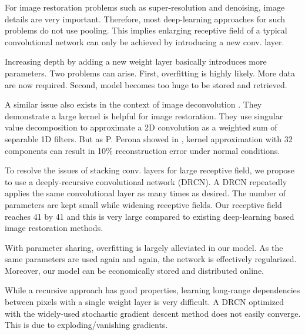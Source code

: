 \documentclass[10pt,twocolumn,letterpaper]{article}
\begin{document}
For image restoration problems such as super-resolution and denoising, image details are very important. Therefore, most deep-learning approaches for such problems do not use pooling. This implies enlarging receptive field of a typical convolutional network can only be achieved by introducing a new conv. layer.

Increasing depth by adding a new weight layer basically introduces more parameters. Two problems can arise. First, overfitting is highly likely. More data are now required. Second, model becomes too huge to be stored and retrieved.

A similar issue also exists in the context of image deconvolution \cite{xu2014deep}. They demonstrate a large kernel is helpful for image restoration. They use singular value decomposition to approximate a 2D convolution as a weighted sum of separable 1D filters. But as P. Perona showed in \cite{perona1995deformable},  kernel approximation with 32 components can result in 10\% reconstruction error under normal conditions. 



To resolve the issues of stacking conv. layers for large receptive field, we propose to use a deeply-recursive convolutional network (DRCN). A DRCN repeatedly applies the same convolutional layer as many times as desired. The number of parameters are kept small while widening receptive fields. Our receptive field reaches 41 by 41 and this is very large compared to existing deep-learning based image restoration methods. 

With parameter sharing, overfitting is largely alleviated in our model. As the same parameters are used again and again, the network is effectively regularized. Moreover, our model can be economically stored and distributed online.   

While a recursive approach has good properties, learning long-range dependencies between pixels with a single weight layer is very difficult. A DRCN optimized with the widely-used stochastic gradient descent method does not easily converge. This is due to exploding/vanishing gradients. 
\end{document}
